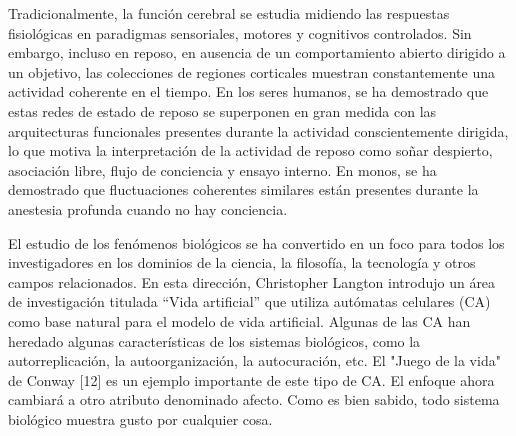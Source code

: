 
Tradicionalmente, la función cerebral se estudia midiendo las respuestas fisiológicas en paradigmas sensoriales, motores y cognitivos controlados. Sin embargo, incluso en reposo, en ausencia de un comportamiento abierto dirigido a un objetivo, las colecciones de regiones corticales muestran constantemente una actividad coherente en el tiempo. En los seres humanos, se ha demostrado que estas redes de estado de reposo se superponen en gran medida con las arquitecturas funcionales presentes durante la actividad conscientemente dirigida, lo que motiva la interpretación de la actividad de reposo como soñar despierto, asociación libre, flujo de conciencia y ensayo interno. En monos, se ha demostrado que fluctuaciones coherentes similares están presentes durante la anestesia profunda cuando no hay conciencia.







El estudio de los fenómenos biológicos se ha convertido en un foco para todos los investigadores en los dominios de la ciencia, la filosofía, la tecnología y otros campos relacionados. En esta dirección, Christopher Langton introdujo un área de investigación titulada “Vida artificial” que utiliza autómatas celulares (CA) como base natural para el modelo de vida artificial. Algunas de las CA han heredado algunas características de los sistemas biológicos, como la autorreplicación, la autoorganización, la autocuración, etc. El "Juego de la vida" de Conway [12] es un ejemplo importante de este tipo de CA. El enfoque ahora cambiará a otro atributo denominado afecto. Como es bien sabido, todo sistema biológico muestra gusto por cualquier cosa.










